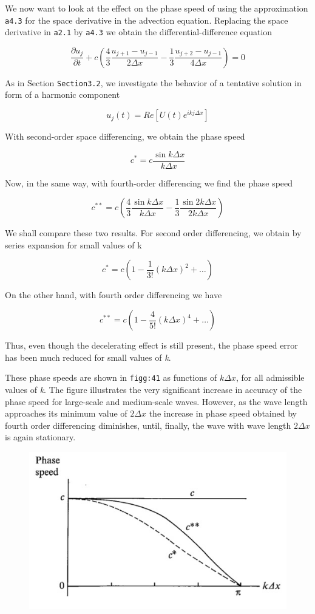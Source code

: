 We now want to look at the effect on the phase speed of using the
approximation \texttt{a4.3} for the space derivative in the advection
equation. Replacing the space derivative in \texttt{a2.1} by
\texttt{a4.3} we obtain the differential-difference equation

\[\frac{\partial u_{j}}{\partial t} + c\left( \frac{4}{3}\frac{u_{j + 1} - u_{j - 1}}{2\Delta x} - \frac{1}{3}\frac{u_{j + 2} - u_{j - 1}}{4\Delta x} \right) = 0\]

As in Section \texttt{Section3.2}, we investigate the behavior of a
tentative solution in form of a harmonic component

\[u_j( t ) = Re\left\lbrack U\left( t \right)e^{ikj\Delta x} \right\rbrack\]

With second-order space differencing, we obtain the phase speed

\[c^{*} = c\frac{\sin{k \Delta x}}{k \Delta x}\]

Now, in the same way, with fourth-order differencing we find the phase
speed

\[c^{**} = c\left( \frac{4}{3}\frac{\sin{k\Delta x}}{k \Delta x}
- \frac{1}{3}\frac{\sin{2k\Delta x}}{2k\Delta x} \right)\]

We shall compare these two results. For second order differencing, we
obtain by series expansion for small values of k

\[c^{*} = c\left( 1 - \frac{1}{3!}\left( k\Delta x \right)^{2} + \ldots \right)\]

On the other hand, with fourth order differencing we have

\[c^{**} = c\left( 1 - \frac{4}{5!}\left( k\Delta x \right)^{4} + \ldots \right)\]

Thus, even though the decelerating effect is still present, the phase
speed error has been much reduced for small values of \emph{k}.

These phase speeds are shown in \texttt{figg:41} as functions of
\(k\Delta x\), for all admissible values of \emph{k}. The figure
illustrates the very significant increase in accuracy of the phase
speed for large-scale and medium-scale waves. However, as the wave
length approaches its minimum value of \(2\Delta x\) the increase in
phase speed obtained by fourth order differencing diminishes, until,
finally, the wave with wave length \(2\Delta x\) is again stationary.

\begin{figure}
\centering
\includegraphics[width = .7 \textwidth]{figs/NM/pic41.jpg}
\caption{} \label{fig:}
\end{figure}

